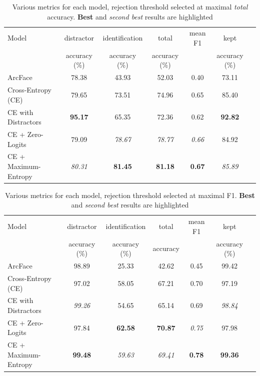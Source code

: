 \begin{table}[]
    \centering
    \begin{tabular}{|l|c|c|c|c|c|c|}
    \hline
        Model & distractor     & identification   & total           & mean F1       & kept  \\
              & accuracy (\%)  &   accuracy (\%)  & accuracy (\%)   &               & accuracy (\%) \\
        \hline
        \hline
        ArcFace & 78.38        & 43.93            & 52.03           & 0.40          & 73.11 \\
        \hline
        Cross-Entropy (CE)  & 79.65           & 73.51            & 74.96           & 0.65          & 85.40 \\
        \hline
        CE with Distractors & \textbf{95.17}   & 65.35            & 72.36           & 0.62          & \textbf{92.82} \\
        \hline
        CE + Zero-Logits & 79.09          & \emph{78.67}      & \emph{78.77}    & \emph{0.66}   & 84.92 \\
        \hline
        CE + Maximum-Entropy & \emph{80.31}     & \textbf{81.45}    & \textbf{81.18}  & \textbf{0.67} & \emph{85.89} \\
        \hline
    \end{tabular}
    \caption{Various metrics for each model, rejection threshold selected at maximal \emph{total} accuracy. \textbf{Best} and \emph{second best} results are highlighted}
    \label{tab:accfrmetrics}
\end{table}

\begin{table}[]
    \centering
    \begin{tabular}{|l|c|c|c|c|c|c|}
    \hline
        Model & distractor     & identification   & total           & mean F1       & kept  \\
              & accuracy (\%)  &   accuracy (\%)  & accuracy        &               & accuracy (\%) \\
        \hline
        \hline
        ArcFace & 98.89        & 25.33            & 42.62           & 0.45          & 99.42 \\
        \hline
        Cross-Entropy (CE)   & 97.02           & 58.05            & 67.21           & 0.70          & 97.19 \\
        \hline
        CE with Distractors & \emph{99.26}   & 54.65            & 65.14           & 0.69          & \emph{98.84}\\
        \hline
        CE + Zero-Logits & 97.84          & \textbf{62.58}      & \textbf{70.87}    & \emph{0.75}   & 97.98 \\
        \hline
        CE + Maximum-Entropy & \textbf{99.48}     & \emph{59.63}       & \emph{69.41}    & \textbf{0.78}   & \textbf{99.36} \\
        \hline
    \end{tabular}
    \caption{Various metrics for each model, rejection threshold selected at maximal F1. \textbf{Best} and \emph{second best} results are highlighted}
    \label{tab:f1frmetrics}
\end{table}

